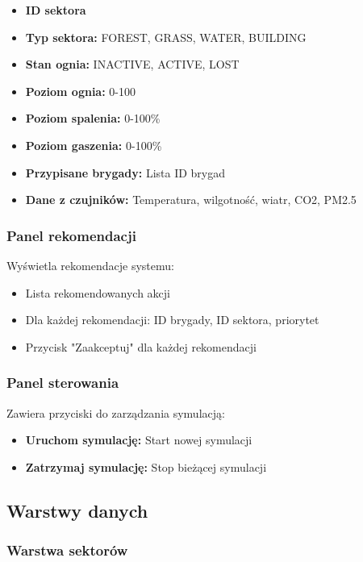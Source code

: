 \documentclass[11pt,a4paper]{article}
\begin{document}
\begin{itemize}
    \item \textbf{ID sektora}
    \item \textbf{Typ sektora:} FOREST, GRASS, WATER, BUILDING
    \item \textbf{Stan ognia:} INACTIVE, ACTIVE, LOST
    \item \textbf{Poziom ognia:} 0-100
    \item \textbf{Poziom spalenia:} 0-100\%
    \item \textbf{Poziom gaszenia:} 0-100\%
    \item \textbf{Przypisane brygady:} Lista ID brygad
    \item \textbf{Dane z czujników:} Temperatura, wilgotność, wiatr, CO2, PM2.5
\end{itemize}

\subsubsection{Panel rekomendacji}

Wyświetla rekomendacje systemu:

\begin{itemize}
    \item Lista rekomendowanych akcji
    \item Dla każdej rekomendacji: ID brygady, ID sektora, priorytet
    \item Przycisk "Zaakceptuj" dla każdej rekomendacji
\end{itemize}

\subsubsection{Panel sterowania}

Zawiera przyciski do zarządzania symulacją:

\begin{itemize}
    \item \textbf{Uruchom symulację:} Start nowej symulacji
    \item \textbf{Zatrzymaj symulację:} Stop bieżącej symulacji
\end{itemize}

\subsection{Warstwy danych}

\subsubsection{Warstwa sektorów}
\end{document}

